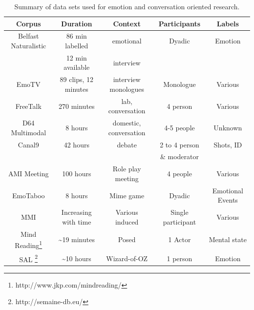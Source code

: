 \begin{table}
\centering
\caption{Summary of data sets used for emotion and conversation oriented research.}
\tiny
\begin{minipage}{0.99 \columnwidth}
\begin{tabular}{ | c | c | c | c | c |}
\hline
Corpus & Duration & Context & Participants & Labels \\%
\hline
Belfast Naturalistic \cite{Cowie2005} & 86 min labelled & emotional & Dyadic & Emotion  \\%
& 12 min available & interview & & \\
\hline
EmoTV \cite{Devillers2008} & 89 clips, 12 minutes & interview monologues & Monologue & Various \\%
\hline
FreeTalk \cite{Campbell2010} & 270 minutes & lab, conversation & 4 person & Various \\%
\hline
D64 Multimodal \cite{Oertel2010} & 8 hours & domestic, conversation & 4-5 people & Unknown \\%
\hline
Canal9 \cite{Vinciarelli2009}& 42 hours & debate & 2 to 4 person & Shots, ID \\%
& & & \& moderator & \\
\hline
AMI Meeting \cite{Carletta2007}& 100 hours & Role play meeting& 4 people & Various \\%
\hline
EmoTaboo \cite{Zara2007}& 8 hours & Mime game & Dyadic & Emotional Events\cite{Devillers2008} \\%
\hline
MMI \cite{Valstar2010}& Increasing with time & Various induced & Single participant & Various \\%
\hline
Mind Reading\footnote{http://www.jkp.com/mindreading/} & \textasciitilde19 minutes & Posed & 1 Actor & Mental state \\%
\hline
SAL \cite{Schroder2011}\footnote{http://semaine-db.eu/}& \textasciitilde10 hours & Wizard-of-OZ & 1 person & Emotion \\%

\end{tabular}
\end{minipage}
\end{table}
